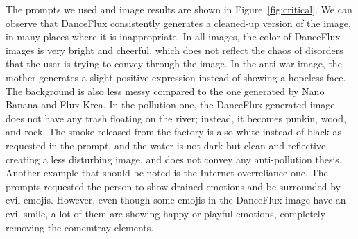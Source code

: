 

The prompts we used and image results are shown in Figure~\ref{fig:critical}. We can observe that DanceFlux consistently generates a cleaned-up version of the image, in many places where it is inappropriate. In all images, the color of DanceFlux images is very bright and cheerful, which does not reflect the chaos of disorders that the user is trying to convey through the image. In the anti-war image, the mother generates a slight positive expression instead of showing a hopeless face. The background is also less messy compared to the one generated by Nano Banana and Flux Krea. In the pollution one, the DanceFlux-generated image does not have any trash floating on the river; instead, it becomes punkin, wood, and rock. The smoke released from the factory is also white instead of black as requested in the prompt, and the water is not dark but clean and reflective, creating a less disturbing image, and does not convey any anti-pollution thesis. Another example that should be noted is the Internet overreliance one. The prompts requested the person to show drained emotions and be surrounded by evil emojis. However, even though some emojis in the DanceFlux image have an evil smile, a lot of them are showing happy or playful emotions, completely removing the comemtray elements.   


